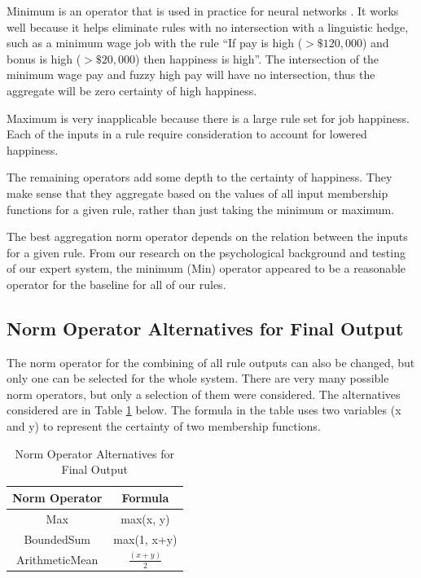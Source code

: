 \documentclass[12pt,fleqn,reqno,letterpaper]{article}
\begin{document}
Minimum is an operator that is used in practice for neural networks \cite{FAKHRI}. It works well because it helps eliminate rules with no intersection with a linguistic hedge, such as a minimum wage job with the rule “If pay is high ($>\$120,000$) and bonus is high ($>\$20,000$) then happiness is high”. The intersection of the minimum wage pay and fuzzy high pay will have no intersection, thus the aggregate will be zero certainty of high happiness.

Maximum is very inapplicable because there is a large rule set for job happiness. Each of the inputs in a rule require consideration to account for lowered happiness.

The remaining operators add some depth to the certainty of happiness. They make sense that they aggregate based on the values of all input membership functions for a given rule, rather than just taking the minimum or maximum.

The best aggregation norm operator depends on the relation between the inputs for a given rule. From our research on the psychological background and testing of our expert system, the minimum (Min) operator appeared to be a reasonable operator for the baseline for all of our rules.

\subsection{Norm Operator Alternatives for Final Output}
The norm operator for the combining of all rule outputs can also be changed, but only one can be selected for the whole system. There are very many possible norm operators, but only a selection of them were considered. The alternatives considered are in Table \ref{tbl:FINAL-NORM} below. The formula in the table uses two variables (x and y) to represent the certainty of two membership functions.

\begin{table}[h]
\caption{Norm Operator Alternatives for Final Output}
\label{tbl:FINAL-NORM}
\centering
\begin{tabular}{|c|c|}
\hline
\textbf{Norm Operator} & \textbf{Formula}  \\ \hline
Max                    & max(x, y)         \\ \hline
BoundedSum             & max(1, x+y)       \\ \hline
ArithmeticMean         & $\frac{(x+y)}{2}$ \\ \hline
\end{tabular}
\end{table}
\end{document}
